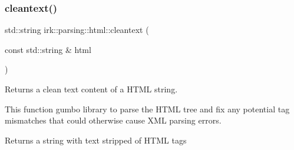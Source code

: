 \subsubsection{\texorpdfstring{cleantext()}{cleantext()}\hspace{0.1cm}{\footnotesize\ttfamily [2/2]}}
{\footnotesize\ttfamily std\+::string irk\+::parsing\+::html\+::cleantext (\begin{DoxyParamCaption}\item[{const std\+::string \&}]{html }\end{DoxyParamCaption})\hspace{0.3cm}{\ttfamily [inline]}}



Returns a clean text content of a H\+T\+ML string. 

This function gumbo library to parse the H\+T\+ML tree and fix any potential tag mismatches that could otherwise cause X\+ML parsing errors. \begin{DoxyReturn}{Returns}
a string with text stripped of H\+T\+ML tags 
\end{DoxyReturn}
